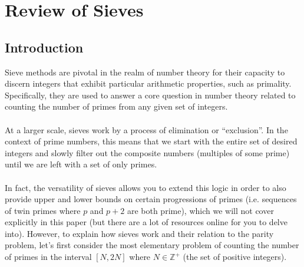 
\section{Review of Sieves}
\subsection{Introduction}
Sieve methods are pivotal in the realm of number theory for their capacity to discern integers that exhibit particular arithmetic properties, such as primality. 
Specifically, they are used to answer a core question in number theory related to counting the number of primes from any given set of integers. \\
\\
At a larger scale, sieves work by a process of elimination or ``exclusion''. In the context of prime numbers, this means that we start with the entire set of desired integers and slowly filter out the composite numbers (multiples of some prime) until we are left with a set of only primes. \\
\\
In fact, the versatility of sieves allows you to extend this logic in order to also provide upper and lower bounds on certain progressions of primes (i.e. sequences of twin primes where $p$ and $p+2$ are both prime), which we will not cover explicitly in this paper (but there are a lot of resources online for you to delve into).
However, to explain how sieves work and their relation to the parity problem, let's first consider the most elementary problem of counting the number of primes in the interval $[N, 2N]$ where $N \in \mathbb{Z}^+$ (the set of positive integers). 
